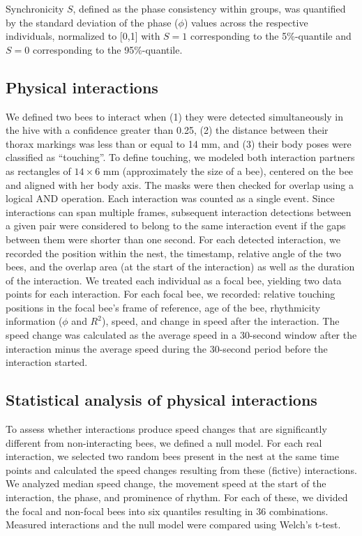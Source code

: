 \documentclass{article}
\begin{document}
Synchronicity $S$, defined as the phase consistency within groups, was quantified by the standard deviation of the phase ($\phi$) values across the respective individuals, normalized to [0,1] with $S=1$ corresponding to the 5\%-quantile and $S=0$ corresponding to the 95\%-quantile.

\subsection*{Physical interactions}
We defined two bees to interact when (1) they were detected simultaneously in the hive with a confidence greater than 0.25, (2) the distance between their thorax markings was less than or equal to 14 mm, and (3) their body poses were classified as “touching”. To define touching, we modeled both interaction partners as rectangles of $14 \times 6$ mm (approximately the size of a bee), centered on the bee and aligned with her body axis. The masks were then checked for overlap using a logical AND operation. Each interaction was counted as a single event. Since interactions can span multiple frames, subsequent interaction detections between a given pair were considered to belong to the same interaction event if the gaps between them were shorter than one second. For each detected interaction, we recorded the position within the nest, the timestamp, relative angle of the two bees, and the overlap area (at the start of the interaction) as well as the duration of the interaction. We treated each individual as a focal bee, yielding two data points for each interaction. For each focal bee, we recorded: relative touching positions in the focal bee’s frame of reference, age of the bee, rhythmicity information ($\phi$ and $R^2$), speed, and change in speed after the interaction. The speed change was calculated as the average speed in a 30-second window after the interaction minus the average speed during the 30-second period before the interaction started.

\subsection*{Statistical analysis of physical interactions}
To assess whether interactions produce speed changes that are significantly different from non-interacting bees, we defined a null model. For each real interaction, we selected two random bees present in the nest at the same time points and calculated the speed changes resulting from these (fictive) interactions. We analyzed median speed change, the movement speed at the start of the interaction, the phase, and prominence of rhythm. For each of these, we divided the focal and non-focal bees into six quantiles resulting in 36 combinations. Measured interactions and the null model were compared using Welch’s t-test.
\end{document}

